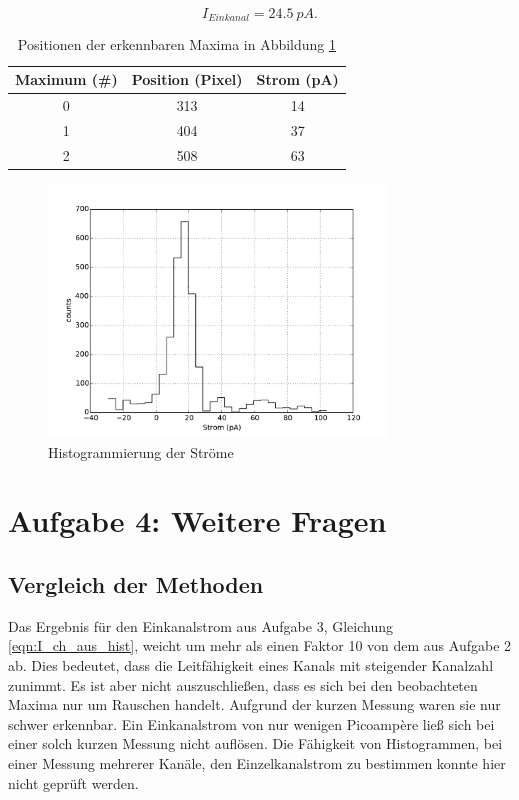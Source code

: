 \documentclass[a4paper,ngerman]{scrartcl}
\begin{document}
\begin{equation}
\label{eqn:I_ch_aus_hist}
I_{Einkanal} = \SI{24.5}{pA} .
\end{equation}


\begin{table}
\centering
\caption{Positionen der erkennbaren Maxima in Abbildung \ref{fig:mehrkanal-histo}}
\label{tab:mehrkanal-maxima}
\begin{tabular}{ccc}
Maximum (\#)	&	Position (Pixel)	&	Strom (pA) \\
\hline
0	&	313	&	14	\\
1	&	404	&	37	\\
2	&	508	&	63	\\
\end{tabular}
\end{table}

\begin{figure}[tbh!]
\includegraphics[width=0.8\textwidth]{abbildungen/mehrkanal_histo.pdf}
\caption{Histogrammierung der Ströme}
\label{fig:mehrkanal-histo}
\end{figure}

\clearpage
\section{Aufgabe 4: Weitere Fragen}

\subsection{Vergleich der Methoden}

Das Ergebnis für den Einkanalstrom aus Aufgabe 3, Gleichung \ref{eqn:I_ch_aus_hist}, weicht um mehr als einen Faktor 10 von dem aus Aufgabe 2 ab. Dies bedeutet, dass die Leitfähigkeit eines Kanals mit steigender Kanalzahl zunimmt. Es ist aber nicht auszuschließen, dass es sich bei den beobachteten Maxima nur um Rauschen handelt. Aufgrund der kurzen Messung waren sie nur schwer erkennbar. Ein Einkanalstrom von nur wenigen Picoampère ließ sich bei einer solch kurzen Messung nicht auflösen. Die Fähigkeit von Histogrammen, bei einer Messung mehrerer Kanäle, den Einzelkanalstrom zu bestimmen konnte hier nicht geprüft werden.
\end{document}
